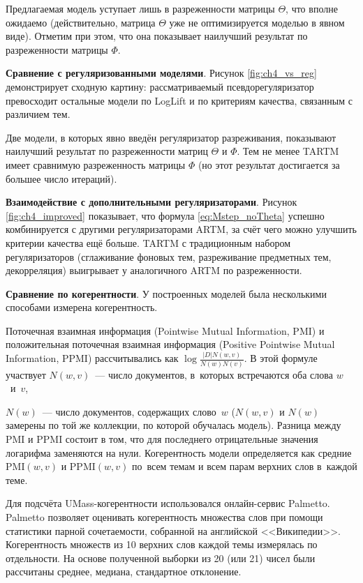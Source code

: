 Предлагаемая модель уступает лишь в разреженности матрицы $\Theta$, что вполне ожидаемо (действительно, матрица $\Theta$ уже не оптимизируется моделью в явном виде). Отметим при этом, что она показывает наилучший результат по разреженности матрицы $\Phi$.

\textbf{Сравнение с регуляризованными моделями}. Рисунок \ref{fig:ch4_vs_reg} демонстрирует сходную картину: рассматриваемый псевдорегуляризатор превосходит остальные модели по LogLift и по критериям качества, связанным с различием тем.

Две модели, в которых явно введён регуляризатор разреживания, показывают наилучший результат по разреженности матриц $\Theta$ и $\Phi$. Тем не менее TARTM имеет сравнимую разреженность матрицы $\Phi$ (но этот результат достигается за большее число итераций).

\textbf{Взаимодействие с дополнительными регуляризаторами}. Рисунок \ref{fig:ch4_improved} показывает, что формула \eqref{eq:Mstep_noTheta} успешно комбинируется с другими регуляризаторами ARTM, за счёт чего можно улучшить критерии качества ещё больше. TARTM с традиционным набором регуляризаторов (сглаживание фоновых тем, разреживание предметных тем, декорреляция) выигрывает у аналогичного ARTM по разреженности.




\textbf{Сравнение по когерентности}. У построенных моделей была несколькими способами измерена когерентность.

Поточечная взаимная информация (Pointwise Mutual Information, PMI) и положительная поточечная взаимная информация (Positive Pointwise Mutual Information, PPMI) рассчитывались как $\log\frac{|D| N(w,v)}{N(w)N(v)}$. В этой формуле участвует $N(w,v)$~--- число документов, в~которых встречаются оба слова $w$~и~$v$,

$N(w)$~--- число документов, содержащих слово~$w$ ($N(w,v)$ и $N(w)$ замерены по той же коллекции, по которой обучалась модель). Разница между PMI и PPMI состоит в том, что для последнего отрицательные значения логарифма заменяются на нули. Когерентность модели определяется как средние $\mathrm{PMI}(w,v)$ и $\mathrm{PPMI}(w,v)$ по~всем темам и всем парам верхних слов в~каждой теме.

Для подсчёта UMass-когерентности использовался онлайн-сервис Palmetto. Palmetto позволяет оценивать когерентность множества слов при помощи статистики парной сочетаемости, собранной на английской <<Википедии>>. Когерентность множеств из 10 верхних слов каждой темы измерялась по отдельности. На основе полученной выборки из 20 (или 21) чисел были рассчитаны среднее, медиана, стандартное отклонение.


